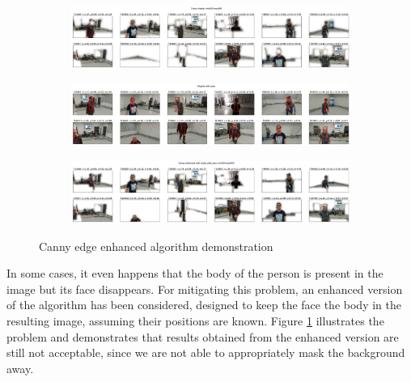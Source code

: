 \begin{figure}[!h]
	\begin{center}
		\begin{subfigure}[h]{1\textwidth}
			\centering
			\includegraphics[width=1\textwidth]{"contents/images/04-1canny-enhance-1"}
		\end{subfigure}
		\vfill
		\begin{subfigure}[h]{1\textwidth}
			\centering
			\includegraphics[width=1\textwidth]{"contents/images/04-1canny-enhance-2"}
		\end{subfigure}
		\vfill
		\begin{subfigure}[h]{1\textwidth}
			\centering
			\includegraphics[width=1\textwidth]{"contents/images/04-1canny-enhance-3"}
		\end{subfigure}
	\end{center}
	\vspace{-0.5cm}
	\caption[Canny edge enhanced algorithm demonstration]{Canny edge enhanced algorithm demonstration}
	\label{fig:canny-enanhced}
\end{figure}

In some cases, it even happens that the body of the person is present in the image but its face disappears. For mitigating this problem, an enhanced version of the algorithm has been considered, designed to keep the face the body in the resulting image, assuming their positions are known. Figure \ref{fig:canny-enanhced} illustrates the problem and demonstrates that results obtained from the enhanced version are still not acceptable, since we are not able to appropriately mask the background away.



